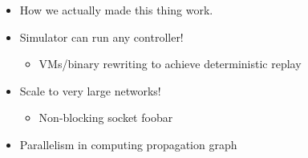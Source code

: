 \begin{itemize}
\item How we actually made this thing work.
\item Simulator can run any controller!
\begin{itemize}
\item VMs/binary rewriting to achieve deterministic replay
\end{itemize}
\item Scale to very large networks!
\begin{itemize}
\item Non-blocking socket foobar
\end{itemize}
\item Parallelism in computing propagation graph
\end{itemize}
